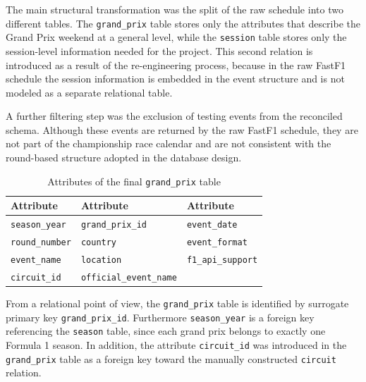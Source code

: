 \documentclass[12pt,a4paper]{article}
\begin{document}
	The main structural transformation was the split of the raw schedule into two different tables.
	The \texttt{grand\_prix} table stores only the attributes that describe the Grand Prix weekend at a general level, while the \texttt{session} table stores only the session-level information needed for the project.
	This second relation is introduced as a result of the re-engineering process, because in the raw FastF1 schedule the session information is embedded in the event structure and is not modeled as a separate relational table.
	
	
	A further filtering step was the exclusion of testing events from the reconciled schema.
	Although these events are returned by the raw FastF1 schedule, they are not part of the championship race calendar and are not consistent with the round-based structure adopted in the database design.

	\begin{table}[H]
		\centering
		\caption{Attributes of the final \texttt{grand\_prix} table}
		\renewcommand{\arraystretch}{1.15}
		\begin{tabularx}{\textwidth}{>{\raggedright\arraybackslash}X >{\raggedright\arraybackslash}X >{\raggedright\arraybackslash}X}
			\toprule
			\textbf{Attribute} & \textbf{Attribute} & \textbf{Attribute} \\
			\midrule
			\texttt{season\_year}         & \texttt{grand\_prix\_id}       & \texttt{event\_date} \\
			\texttt{round\_number}        & \texttt{country}               & \texttt{event\_format} \\
			\texttt{event\_name}          & \texttt{location}              & \texttt{f1\_api\_support} \\
			\texttt{circuit\_id}          & \texttt{official\_event\_name}  &                         \\
			\bottomrule
		\end{tabularx}
	\end{table}
	
	From a relational point of view, the \texttt{grand\_prix} table is identified by surrogate primary key  \texttt{grand\_prix\_id}.
	Furthermore \texttt{season\_year} is a foreign key referencing the \texttt{season} table, since each grand prix belongs to exactly one Formula 1 season.
	In addition, the attribute \texttt{circuit\_id} was introduced in the \texttt{grand\_prix} table as a foreign key toward the manually constructed \texttt{circuit} relation.
	
\end{document}
